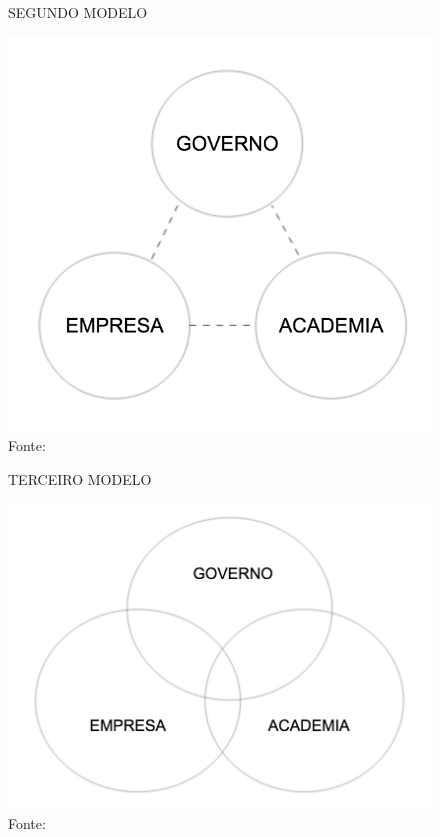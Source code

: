 \begin{figure}
\caption{SEGUNDO MODELO}
\centerline{\includegraphics[scale=0.5]{img/triplehelix2}}
\label{fig:triplehelix2}
\caption* {Fonte: }
\end{figure}

\begin{figure}
\caption{TERCEIRO MODELO}
\centerline{\includegraphics[scale=0.5]{img/triplehelix3}}
\label{fig:triplehelix3}
\caption* {Fonte: }
\end{figure}

